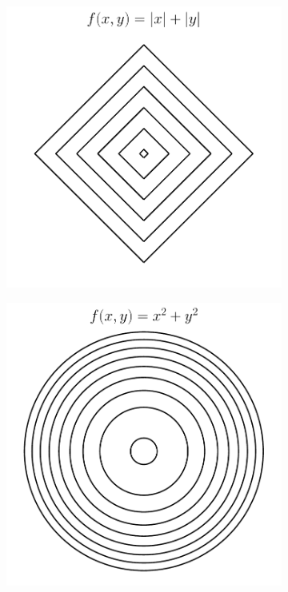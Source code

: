 \begin{figure}[t]
\begin{subfigure}{0.325\textwidth}
\includegraphics[width=0.99\linewidth]{ebookML_src/src/convexity/abs_2d.pdf}
\caption{}
\end{subfigure}
\begin{subfigure}{0.325\textwidth}
\includegraphics[height=1.02\linewidth]{ebookML_src/src/convexity/norm_2d.pdf}

\end{subfigure}
\end{figure}
